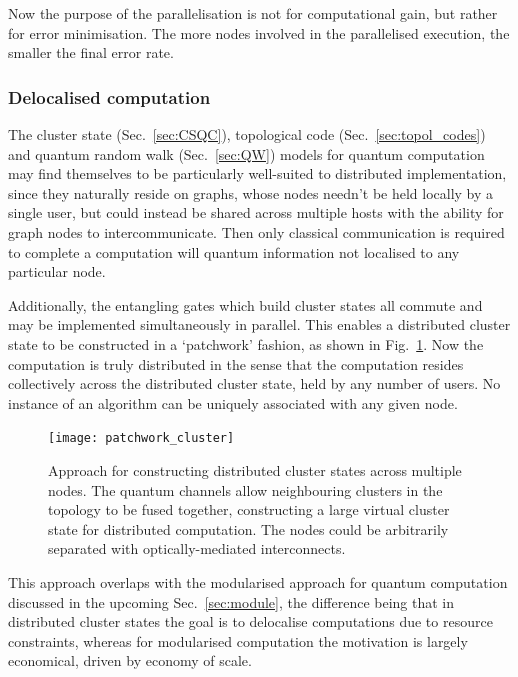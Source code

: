 Now the purpose of the parallelisation is not for computational gain, but rather for error minimisation. The more nodes involved in the parallelised execution, the smaller the final error rate.

\subsubsection{Delocalised computation}

The cluster state (Sec.~\ref{sec:CSQC}), topological code (Sec.~\ref{sec:topol_codes}) and quantum random walk (Sec.~\ref{sec:QW}) models for quantum computation may find themselves to be particularly well-suited to distributed implementation, since they naturally reside on graphs, whose nodes needn't be held locally by a single user, but could instead be shared across multiple hosts with the ability for graph nodes to intercommunicate. Then only classical communication is required to complete a computation will quantum information not localised to any particular node.

Additionally, the entangling gates which build cluster states all commute and may be implemented simultaneously in parallel. This enables a distributed cluster state to be constructed in a `patchwork' fashion, as shown in Fig.~\ref{fig:patchwork_cluster}. Now the computation is truly distributed in the sense that the computation resides collectively across the distributed cluster state, held by any number of users. No instance of an algorithm can be uniquely associated with any given node.

\begin{figure}[!htbp]
\texttt{[image: patchwork\_cluster]} 
\captionspace \caption{Approach for constructing distributed cluster states across multiple nodes. The quantum channels allow neighbouring clusters in the topology to be fused together, constructing a large virtual cluster state for distributed computation. The nodes could be arbitrarily separated with optically-mediated interconnects.} \label{fig:patchwork_cluster}
\end{figure}

This approach overlaps with the modularised approach for quantum computation discussed in the upcoming Sec.~\ref{sec:module}, the difference being that in distributed cluster states the goal is to delocalise computations due to resource constraints, whereas for modularised computation the motivation is largely economical, driven by economy of scale.

